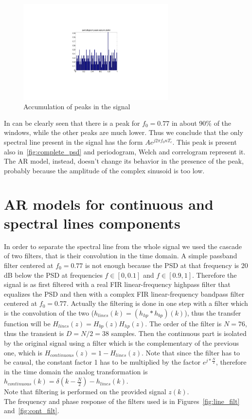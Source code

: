 \documentclass[10pt]{article}
\numberwithin{equation}{section}
\begin{document}
\begin{figure}[h!]
  \centering
  \includegraphics[width = 0.7\textwidth]{images/period_acc_temp.pdf}
  \caption{Accumulation of peaks in the signal}
  \label{fig:peak_acc}
\end{figure}

In can be clearly seen that there is a peak for $f_0 = 0.77$ in about 90\% of the windows, while the other peaks are much lower. Thus we conclude that the only spectral line present in the signal has the form $A e^{j 2 \pi f_0 n T_c}$. This peak is present also in~\ref{fig:complete_psd} and periodogram, Welch and correlogram represent it. The AR model, instead, doesn't change its behavior in the presence of the peak, probably because the amplitude of the complex sinusoid is too low.

\section{AR models for continuous and spectral lines components}
In order to separate the spectral line from the whole signal we used the cascade of two filters, that is their convolution in the time domain. A simple passband filter centered at $f_0 = 0.77$ is not enough because the PSD at that frequency is 20 dB below the PSD at frequencies $f \in [0, 0.1]$ and $f \in [0.9, 1]$. Therefore the signal is as first filtered with a real FIR linear-frequency highpass filter that equalizes the PSD and then with a complex FIR linear-frequency bandpass filter centered at $f_0 = 0.77$. Actually the filtering is done in one step with a filter which is the convolution of the two ($h_{lines}(k) = (h_{hp}*h_{bp})(k)$), thus the transfer function will be $H_{lines}(z) = H_{bp}(z)H_{hp}(z)$. The order of the filter is $N = 76$, thus the transient is $D = N/2 = 38$ samples. Then the continuous part is isolated by the original signal using a filter which is the complementary of the previous one, which is $H_{continuous}(z)= 1 - H_{lines}(z)$. Note that since the filter has to be causal, the constant factor 1 has to be multiplied by the factor $e^{j*\frac{N}{2}}$, therefore in the time domain the analog transformation is $h_{continuous}(k) = \delta(k - \frac{N}{2}) - h_{lines}(k)$. \\
Note that filtering is performed on the provided signal $z(k)$. \\
The frequency and phase response of the filters used is in Figures~\ref{fig:line_filt} and~\ref{fig:cont_filt}.\\
\end{document}
